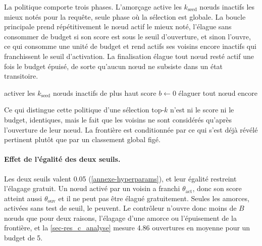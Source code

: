 La politique comporte trois phases. L'amorçage active les
$k_{\text{seed}}$ nœuds inactifs les mieux notés pour la requête, seule phase où
la sélection est globale. La boucle principale prend répétitivement le
nœud actif le mieux noté, l'élague sans consommer de budget si son score est sous
le seuil d'ouverture, et sinon l'ouvre, ce qui consomme une unité de budget et
rend actifs ses voisins encore inactifs qui franchissent le seuil d'activation.
La finalisation élague tout nœud resté actif une fois le budget épuisé,
de sorte qu'aucun nœud ne subsiste dans un état transitoire.
 
\begin{algorithm}[t]
\caption{Contrôle de preuves  sous budget}
\label{alg-controleur}
\DontPrintSemicolon
{}
activer les $k_{\text{seed}}$ nœuds inactifs de plus haut score\;
$b \leftarrow 0$\;
élaguer tout nœud encore \;
\;
\end{algorithm}
 
Ce qui distingue cette politique d'une sélection top-$k$ n'est ni le score ni le
budget, identiques, mais le fait que les voisins ne sont considérés qu'après
l'ouverture de leur nœud. La frontière est conditionnée par ce qui s'est déjà
révélé pertinent plutôt que par un classement global figé.
 
\paragraph{Effet de l'égalité des deux seuils.} Les deux seuils valent \num{0.05}
(\cref{annexe-hyperparams}), et leur égalité restreint l'élagage gratuit. Un
nœud activé par un voisin a franchi $\theta_{\text{act}}$, donc son score atteint
aussi $\theta_{\text{ouv}}$ et il ne peut pas être élagué gratuitement. Seules
les amorces, activées sans test de seuil, le peuvent. Le contrôleur n'ouvre donc
moins de $B$ nœuds que pour deux raisons, l'élagage d'une amorce ou l'épuisement
de la frontière, et la \cref{sec-res_c_analyse} mesure \num{4.86} ouvertures en
moyenne pour un budget de \num{5}.
 
